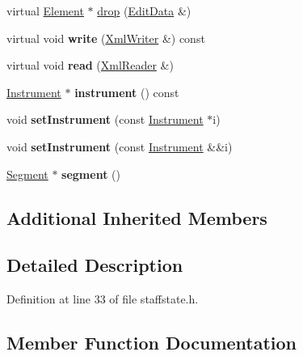 \begin{DoxyCompactItemize}
virtual \hyperlink{class_ms_1_1_element}{Element} $\ast$ \hyperlink{class_ms_1_1_staff_state_a053476091ca14ed47e7e79e9bd1202cf}{drop} (\hyperlink{class_ms_1_1_edit_data}{Edit\+Data} \&)
\item 
\mbox{\label{class_ms_1_1_staff_state_ae1b1e65cf714a9433236a4246351442a}} 
virtual void {\bfseries write} (\hyperlink{class_ms_1_1_xml_writer}{Xml\+Writer} \&) const
\item 
\mbox{\label{class_ms_1_1_staff_state_a993805d2fa48d7ab098320482fef06aa}} 
virtual void {\bfseries read} (\hyperlink{class_ms_1_1_xml_reader}{Xml\+Reader} \&)
\item 
\mbox{\label{class_ms_1_1_staff_state_a0d9151d7fe96504896e3c2561565d5d0}} 
\hyperlink{class_ms_1_1_instrument}{Instrument} $\ast$ {\bfseries instrument} () const
\item 
\mbox{\label{class_ms_1_1_staff_state_ab80b35209bac4bdc7e43742d3522634b}} 
void {\bfseries set\+Instrument} (const \hyperlink{class_ms_1_1_instrument}{Instrument} $\ast$i)
\item 
\mbox{\label{class_ms_1_1_staff_state_a36a68772d94f45d489d6afd6d33f42a5}} 
void {\bfseries set\+Instrument} (const \hyperlink{class_ms_1_1_instrument}{Instrument} \&\&i)
\item 
\mbox{\label{class_ms_1_1_staff_state_a9685ebca4f653d2d171d50e00093c4f3}} 
\hyperlink{class_ms_1_1_segment}{Segment} $\ast$ {\bfseries segment} ()
\end{DoxyCompactItemize}
\subsection*{Additional Inherited Members}


\subsection{Detailed Description}


Definition at line 33 of file staffstate.\+h.



\subsection{Member Function Documentation}
\mbox{\label{class_ms_1_1_staff_state_a921c2d01ac4a6528ccd68f90c4a1918b}} 
